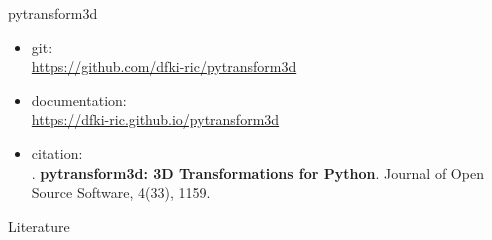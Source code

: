 \documentclass[14pt]{beamer}
\begin{document}
\begin{frame}{pytransform3d}
\begin{itemize}
\item git:\\{\small \url{https://github.com/dfki-ric/pytransform3d}}
\item documentation:\\{\small \url{https://dfki-ric.github.io/pytransform3d}}
\item citation:\\
\textcite{Fabisch2019}. \textbf{pytransform3d: 3D Transformations for Python}. Journal of Open Source Software, 4(33), 1159.
\end{itemize}
\end{frame}

\begin{frame}[t,allowframebreaks]{Literature}
\printbibliography[heading=none]
\end{frame}
\end{document}
